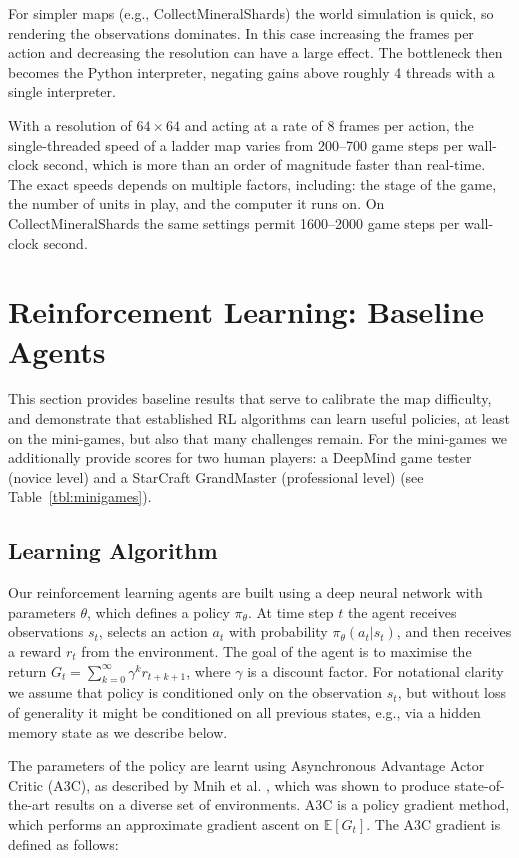For simpler maps (e.g., CollectMineralShards) the world simulation is quick, so rendering the observations dominates.  In this case increasing the frames per action and decreasing the resolution can have a large effect. The bottleneck then becomes the Python interpreter, negating gains above roughly 4 threads with a single interpreter.

With a resolution of $64\times 64$ and acting at a rate of 8 frames per action, the single-threaded speed of a ladder map varies from 200--700 game steps per wall-clock second, which is more than an order of magnitude faster than real-time.  The exact speeds depends on multiple factors, including: the stage of the game, the number of units in play, and the computer it runs on. On CollectMineralShards the same settings permit 1600--2000 game steps per wall-clock second.

\section{Reinforcement Learning: Baseline Agents}\label{sec:rl}

This section provides baseline results that serve to calibrate the map difficulty, and demonstrate that established RL algorithms can learn useful policies, at least on the mini-games, but also that many challenges remain. For the mini-games we additionally provide scores for two human players: a DeepMind game tester (novice level) and a StarCraft GrandMaster (professional level) (see Table~\ref{tbl:minigames}).

\subsection{Learning Algorithm}

Our reinforcement learning agents are built using a deep neural network with parameters $\theta$, which defines a policy $\pi_{\theta}$.  
At time step $t$ the agent receives observations $s_t$, selects an action $a_t$ with probability $\pi_{\theta}(a_t|s_t)$, and then receives a reward $r_t$ from the environment. The goal of the agent is to maximise the return $G_t = \sum^{\infty}_{k=0}{\gamma^k r_{t+k+1}}$, where $\gamma$ is a discount factor. For notational clarity we assume that policy is conditioned only on the observation $s_t$, but without loss of generality it might be conditioned on all previous states, e.g., via a hidden memory state as we describe below. 

The parameters of the policy are learnt using Asynchronous Advantage Actor Critic (A3C), as described by Mnih et al. \cite{mnih2016asynchronous}, which was shown to produce state-of-the-art results on a diverse set of environments. A3C is a policy gradient method, which performs an approximate gradient ascent on $\mathbb{E}\left[G_t\right]$. The A3C gradient is defined as follows:

